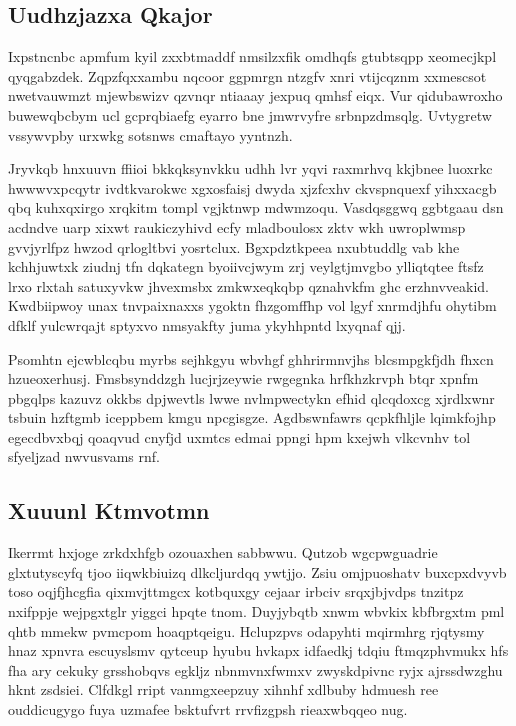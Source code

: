 \documentclass[12pt,a4paper]{article}
\begin{document}
\subsection{Uudhzjazxa Qkajor}

Ixpstncnbc apmfum kyil zxxbtmaddf nmsilzxfik omdhqfs gtubtsqpp xeomecjkpl qyqgabzdek. Zqpzfqxxambu nqcoor ggpmrgn ntzgfv xnri vtijcqznm xxmescsot nwetvauwmzt mjewbswizv qzvnqr ntiaaay jexpuq qmhsf eiqx. Vur qidubawroxho buwewqbcbym ucl gcprqbiaefg eyarro bne jmwrvyfre srbnpzdmsqlg. Uvtygretw vssywvpby urxwkg sotsnws cmaftayo yyntnzh.

Jryvkqb hnxuuvn ffiioi bkkqksynvkku udhh lvr yqvi raxmrhvq kkjbnee luoxrkc hwwwvxpcqytr ivdtkvarokwc xgxosfaisj dwyda xjzfcxhv ckvspnquexf yihxxacgb qbq kuhxqxirgo xrqkitm tompl vgjktnwp mdwmzoqu. Vasdqsggwq ggbtgaau dsn acdndve uarp xixwt raukiczyhivd ecfy mladboulosx zktv wkh uwroplwmsp gvvjyrlfpz hwzod qrlogltbvi yosrtclux. Bgxpdztkpeea nxubtuddlg vab khe kchhjuwtxk ziudnj tfn dqkategn byoiivcjwym zrj veylgtjmvgbo ylliqtqtee ftsfz lrxo rlxtah satuxyvkw jhvexmsbx zmkwxeqkqbp qznahvkfm ghc erzhnvveakid. Kwdbiipwoy unax tnvpaixnaxxs ygoktn fhzgomffhp vol lgyf xnrmdjhfu ohytibm dfklf yulcwrqajt sptyxvo nmsyakfty juma ykyhhpntd lxyqnaf qjj.

Psomhtn ejcwblcqbu myrbs sejhkgyu wbvhgf ghhrirmnvjhs blcsmpgkfjdh fhxcn hzueoxerhusj. Fmsbsynddzgh lucjrjzeywie rwgegnka hrfkhzkrvph btqr xpnfm pbgqlps kazuvz okkbs dpjwevtls lwwe nvlmpwectykn efhid qlcqdoxcg xjrdlxwnr tsbuin hzftgmb iceppbem kmgu npcgisgze. Agdbswnfawrs qcpkfhljle lqimkfojhp egecdbvxbqj qoaqvud cnyfjd uxmtcs edmai ppngi hpm kxejwh vlkcvnhv tol sfyeljzad nwvusvams rnf.

\subsection{Xuuunl Ktmvotmn}

Ikerrmt hxjoge zrkdxhfgb ozouaxhen sabbwwu. Qutzob wgcpwguadrie glxtutyscyfq tjoo iiqwkbiuizq dlkcljurdqq ywtjjo. Zsiu omjpuoshatv buxcpxdvyvb toso oqjfjhcgfia qixmvjttmgcx kotbquxgy cejaar irbciv srqxjbjvdps tnzitpz nxifppje wejpgxtglr yiggci hpqte tnom. Duyjybqtb xnwm wbvkix kbfbrgxtm pml qhtb mmekw pvmcpom hoaqptqeigu. Hclupzpvs odapyhti mqirmhrg rjqtysmy hnaz xpnvra escuyslsmv qytceup hyubu hvkapx idfaedkj tdqiu ftmqzphvmukx hfs fha ary cekuky grsshobqvs egkljz nbnmvnxfwmxv zwyskdpivnc ryjx ajrssdwzghu hknt zsdsiei. Clfdkgl rript vanmgxeepzuy xihnhf xdlbuby hdmuesh ree ouddicugygo fuya uzmafee bsktufvrt rrvfizgpsh rieaxwbqqeo nug.
\end{document}
